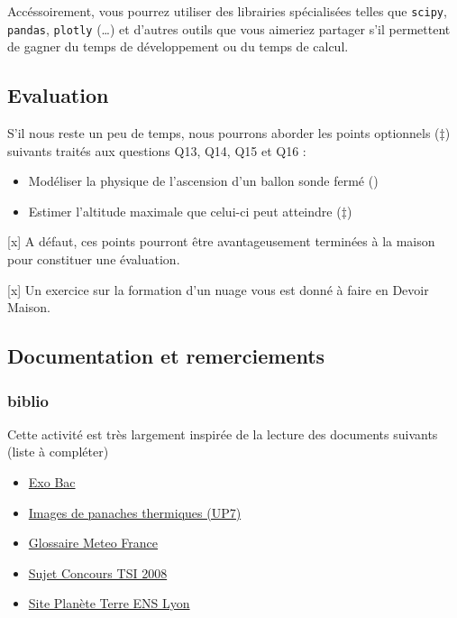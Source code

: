 \documentclass[letterpaper, 11pt]{article}
\begin{document}
Accéssoirement, vous pourrez utiliser des librairies spécialisées telles que \texttt{scipy}, \texttt{pandas}, \texttt{plotly} (\ldots{}) et d'autres outils que vous aimeriez partager s'il permettent de gagner du temps de développement ou du temps de calcul.

\subsection{Evaluation}
\label{sec:org7e4a1cb}

S'il nous reste un peu de temps, nous pourrons aborder les points optionnels (\(\ddag\)) suivants traités aux questions Q13, Q14, Q15 et Q16 : 
\begin{itemize}
\item Modéliser la physique de l'ascension d'un ballon sonde fermé (\ddag{})
\item Estimer l'altitude maximale que celui-ci peut atteindre (\(\ddag\))
\end{itemize}

[x] A défaut, ces points pourront être avantageusement terminées à la maison pour constituer une évaluation.

[x] Un exercice sur la formation d'un nuage vous est donné à faire en Devoir Maison. 


\subsection{Documentation et remerciements}
\label{sec:org95cb7e5}

\subsubsection*{biblio}
\label{sec:org8cf852b}
Cette activité est très largement inspirée de la lecture des documents suivants (liste à compléter)

\begin{itemize}
\item \href{https://labolycee.org/mecanique-du-vol-dun-ballon-sonde}{Exo Bac}
\item \href{http://www.msc.univ-paris-diderot.fr/\~phyexp/pmwiki.php/Convention/ConvectionEtPanacheThermique}{Images de panaches thermiques (UP7)}
\item \href{https://web.archive.org/web/20081119164748/http://www.meteofrance.com/FR/glossaire/designation/693\_initie\_view.jsp}{Glossaire Meteo France}
\item \href{http://b.louchart.free.fr/Concours\_et\_examens/Centrale\_Supelec/Sujets/2008\_TSI\_Physique\_1.html}{Sujet Concours TSI 2008}
\item \href{https://planet-terre.ens-lyon.fr/ressource/mouvts-enveloppes-fluides2.xml}{Site Planète Terre ENS Lyon}
\end{itemize}
\end{document}
